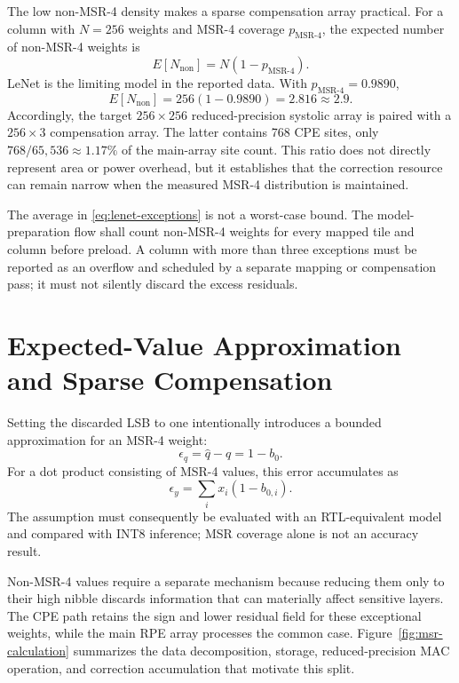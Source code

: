 \documentclass[12pt,a4paper]{report}
\newcommand{\msrfour}{\mathrm{MSR\text{-}4}}
\begin{document}
The low non-MSR-4 density makes a sparse compensation array practical. For a column with $N=256$ weights and MSR-4 coverage $p_{\msrfour}$, the expected number of non-MSR-4 weights is
\begin{equation}
    E[N_{\mathrm{non}}]=N(1-p_{\msrfour}).
    \label{eq:exception-density}
\end{equation}
LeNet is the limiting model in the reported data. With $p_{\msrfour}=0.9890$,
\begin{equation}
    E[N_{\mathrm{non}}]=256(1-0.9890)=2.816\approx2.9.
    \label{eq:lenet-exceptions}
\end{equation}
Accordingly, the target $256\times256$ reduced-precision systolic array is paired with a $256\times3$ compensation array. The latter contains 768 CPE sites, only $768/65{,}536\approx1.17\%$ of the main-array site count. This ratio does not directly represent area or power overhead, but it establishes that the correction resource can remain narrow when the measured MSR-4 distribution is maintained.

The average in \eqref{eq:lenet-exceptions} is not a worst-case bound. The model-preparation flow shall count non-MSR-4 weights for every mapped tile and column before preload. A column with more than three exceptions must be reported as an overflow and scheduled by a separate mapping or compensation pass; it must not silently discard the excess residuals.

\section{Expected-Value Approximation and Sparse Compensation}

Setting the discarded LSB to one intentionally introduces a bounded approximation for an MSR-4 weight:
\begin{equation}
    \epsilon_q=\hat{q}-q=1-b_0.
    \label{eq:lsb-error}
\end{equation}
For a dot product consisting of MSR-4 values, this error accumulates as
\begin{equation}
    \epsilon_y=\sum_i x_i(1-b_{0,i}).
    \label{eq:dot-product-error}
\end{equation}
The assumption must consequently be evaluated with an RTL-equivalent model and compared with INT8 inference; MSR coverage alone is not an accuracy result.

Non-MSR-4 values require a separate mechanism because reducing them only to their high nibble discards information that can materially affect sensitive layers. The CPE path retains the sign and lower residual field for these exceptional weights, while the main RPE array processes the common case. Figure~\ref{fig:msr-calculation} summarizes the data decomposition, storage, reduced-precision MAC operation, and correction accumulation that motivate this split.
\end{document}
